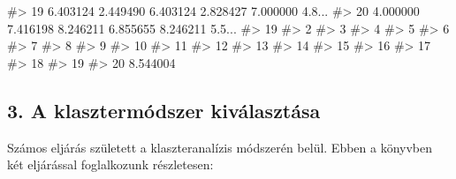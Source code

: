 \documentclass[
  letterpaper,
]{krantz}
\makeatletter
\newenvironment{Shaded}{\begin{snugshade}}{\end{snugshade}}
\newcommand{\CommentTok}[1]{\textcolor[rgb]{0.37,0.37,0.37}{#1}}
\newenvironment{kframe}{%
\medskip{}
\setlength{\fboxsep}{.8em}
 \def\at@end@of@kframe{}%
 \ifinner\ifhmode%
  \def\at@end@of@kframe{\end{minipage}}%
  \begin{minipage}{\columnwidth}%
 \fi\fi%
 \def\FrameCommand##1{\hskip\@totalleftmargin \hskip-\fboxsep
 \colorbox{shadecolor}{##1}\hskip-\fboxsep
     \hskip-\linewidth \hskip-\@totalleftmargin \hskip\columnwidth}%
 \MakeFramed {\advance\hsize-\width
   \@totalleftmargin\z@ \linewidth\hsize
   \@setminipage}}%
 {\par\unskip\endMakeFramed%
 \at@end@of@kframe}
\renewenvironment{Shaded}{\begin{kframe}}{\end{kframe}}
\makeatother
\begin{document}
\begin{Shaded}
\begin{Highlighting}[]
\CommentTok{\#\textgreater{} 19 6.403124 2.449490 6.403124 2.828427 7.000000 4.8...}
\CommentTok{\#\textgreater{} 20 4.000000 7.416198 8.246211 6.855655 8.246211 5.5...}
\CommentTok{\#\textgreater{}          19}
\CommentTok{\#\textgreater{} 2          }
\CommentTok{\#\textgreater{} 3          }
\CommentTok{\#\textgreater{} 4          }
\CommentTok{\#\textgreater{} 5          }
\CommentTok{\#\textgreater{} 6          }
\CommentTok{\#\textgreater{} 7          }
\CommentTok{\#\textgreater{} 8          }
\CommentTok{\#\textgreater{} 9          }
\CommentTok{\#\textgreater{} 10         }
\CommentTok{\#\textgreater{} 11         }
\CommentTok{\#\textgreater{} 12         }
\CommentTok{\#\textgreater{} 13         }
\CommentTok{\#\textgreater{} 14         }
\CommentTok{\#\textgreater{} 15         }
\CommentTok{\#\textgreater{} 16         }
\CommentTok{\#\textgreater{} 17         }
\CommentTok{\#\textgreater{} 18         }
\CommentTok{\#\textgreater{} 19         }
\CommentTok{\#\textgreater{} 20 8.544004}
\end{Highlighting}
\end{Shaded}

\hypertarget{a-klasztermuxf3dszer-kivuxe1lasztuxe1sa}{%
\subsection{3. A klasztermódszer
kiválasztása}\label{a-klasztermuxf3dszer-kivuxe1lasztuxe1sa}}

Számos eljárás született a klaszteranalízis módszerén belül. Ebben a
könyvben két eljárással foglalkozunk részletesen:
\end{document}
